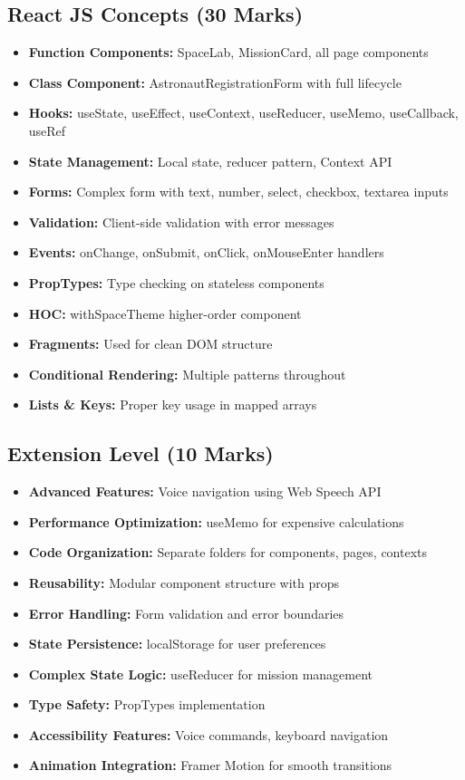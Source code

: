 \documentclass[12pt,a4paper]{article}
\begin{document}
\subsection{React JS Concepts (30 Marks)}
\begin{itemize}
    \item \textbf{Function Components:} SpaceLab, MissionCard, all page components
    \item \textbf{Class Component:} AstronautRegistrationForm with full lifecycle
    \item \textbf{Hooks:} useState, useEffect, useContext, useReducer, useMemo, useCallback, useRef
    \item \textbf{State Management:} Local state, reducer pattern, Context API
    \item \textbf{Forms:} Complex form with text, number, select, checkbox, textarea inputs
    \item \textbf{Validation:} Client-side validation with error messages
    \item \textbf{Events:} onChange, onSubmit, onClick, onMouseEnter handlers
    \item \textbf{PropTypes:} Type checking on stateless components
    \item \textbf{HOC:} withSpaceTheme higher-order component
    \item \textbf{Fragments:} Used for clean DOM structure
    \item \textbf{Conditional Rendering:} Multiple patterns throughout
    \item \textbf{Lists \& Keys:} Proper key usage in mapped arrays
\end{itemize}

\subsection{Extension Level (10 Marks)}
\begin{itemize}
    \item \textbf{Advanced Features:} Voice navigation using Web Speech API
    \item \textbf{Performance Optimization:} useMemo for expensive calculations
    \item \textbf{Code Organization:} Separate folders for components, pages, contexts
    \item \textbf{Reusability:} Modular component structure with props
    \item \textbf{Error Handling:} Form validation and error boundaries
    \item \textbf{State Persistence:} localStorage for user preferences
    \item \textbf{Complex State Logic:} useReducer for mission management
    \item \textbf{Type Safety:} PropTypes implementation
    \item \textbf{Accessibility Features:} Voice commands, keyboard navigation
    \item \textbf{Animation Integration:} Framer Motion for smooth transitions
\end{itemize}
\end{document}
